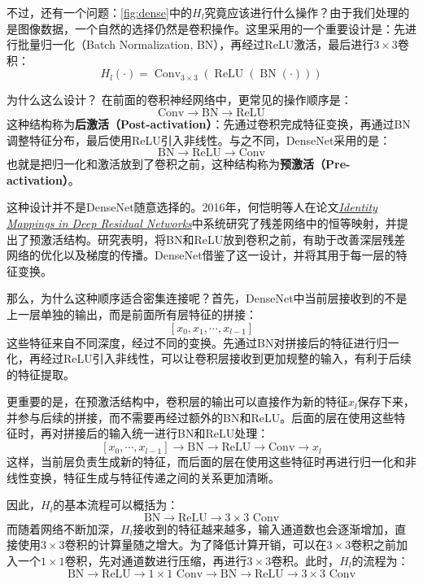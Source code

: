 不过，还有一个问题：\cref{fig:dense}中的$H_l$究竟应该进行什么操作？由于我们处理的是图像数据，一个自然的选择仍然是卷积操作。这里采用的一个重要设计是：先进行批量归一化（Batch Normalization, BN），再经过ReLU激活，最后进行$3\times3$卷积：
$$
H_l(\cdot)=\operatorname{Conv}_{3\times3}\left(\operatorname{ReLU}\left(\operatorname{BN}(\cdot)\right)\right)
$$

\begin{orangeBox}{为什么这么设计？}
在前面的卷积神经网络中，更常见的操作顺序是：
$$
\text{Conv}\rightarrow\text{BN}\rightarrow\text{ReLU}
$$
这种结构称为\textbf{后激活（Post-activation）}：先通过卷积完成特征变换，再通过BN调整特征分布，最后使用ReLU引入非线性。与之不同，DenseNet采用的是：
$$
\text{BN}\rightarrow\text{ReLU}\rightarrow\text{Conv}
$$
也就是把归一化和激活放到了卷积之前，这种结构称为\textbf{预激活（Pre-activation）}。

这种设计并不是DenseNet随意选择的。2016年，何恺明等人在论文\href{https://arxiv.org/abs/1603.05027}{\textit{Identity Mappings in Deep Residual Networks}}中系统研究了残差网络中的恒等映射，并提出了预激活结构。研究表明，将BN和ReLU放到卷积之前，有助于改善深层残差网络的优化以及梯度的传播。DenseNet借鉴了这一设计，并将其用于每一层的特征变换。

那么，为什么这种顺序适合密集连接呢？首先，DenseNet中当前层接收到的不是上一层单独的输出，而是前面所有层特征的拼接：
$$
[x_0,x_1,\cdots,x_{l-1}]
$$
这些特征来自不同深度，经过不同的变换。先通过BN对拼接后的特征进行归一化，再经过ReLU引入非线性，可以让卷积层接收到更加规整的输入，有利于后续的特征提取。

更重要的是，在预激活结构中，卷积层的输出可以直接作为新的特征$x_l$保存下来，并参与后续的拼接，而不需要再经过额外的BN和ReLU。后面的层在使用这些特征时，再对拼接后的输入统一进行BN和ReLU处理：
$$
[x_0,\cdots,x_{l-1}]\rightarrow\text{BN}\rightarrow\text{ReLU}\rightarrow\text{Conv}\rightarrow x_l
$$
这样，当前层负责生成新的特征，而后面的层在使用这些特征时再进行归一化和非线性变换，特征生成与特征传递之间的关系更加清晰。

因此，$H_l$的基本流程可以概括为：
$$
\text{BN}\rightarrow\text{ReLU}\rightarrow3\times3\text{ Conv}
$$
而随着网络不断加深，$H_l$接收到的特征越来越多，输入通道数也会逐渐增加，直接使用$3\times3$卷积的计算量随之增大。为了降低计算开销，可以在$3\times3$卷积之前加入一个$1\times1$卷积，先对通道数进行压缩，再进行$3\times3$卷积。此时，$H_l$的流程为：
$$
\text{BN}\rightarrow\text{ReLU}\rightarrow1\times1\text{ Conv} \rightarrow\text{BN}\rightarrow\text{ReLU}\rightarrow3\times3\text{ Conv}
$$
\end{orangeBox}

